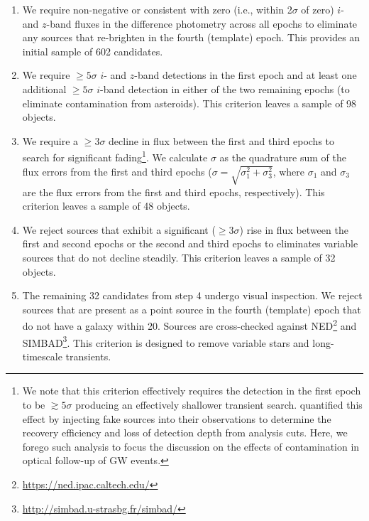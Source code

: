\begin{enumerate}

\item We require non-negative or consistent with zero 
(i.e., within 2$\sigma$ of zero) 
$i$- and $z$-band fluxes in the difference photometry
across all epochs to eliminate any sources that re-brighten in the 
fourth (template) epoch. This provides an initial sample of 602 candidates.

\item We require $\ge 5\sigma$ $i$- and $z$-band detections in the
first epoch and at least one additional $\ge 5\sigma$ $i$-band
detection in either of the two remaining epochs (to eliminate contamination
from asteroids). This criterion leaves a sample of 98 objects.

\clearpage
\item We require a $\ge 3\sigma$ decline in flux between the first and
third epochs to search for significant fading\footnote{\singlespace We note that this 
criterion effectively requires the detection in the first epoch to be $\gtrsim 5\sigma$ 
producing an effectively shallower transient search.  \citet{GW150914DECam} quantified this effect by injecting fake sources into 
their observations to determine the recovery efficiency and loss of detection
depth from analysis cuts. Here, we forego 
such analysis to focus the discussion on the effects of contamination in 
optical follow-up of GW events.}. We calculate $\sigma$ as the 
quadrature sum of the flux errors from the first and third epochs 
($\sigma = \sqrt{\sigma_1^2 + \sigma_3^2}$, where $\sigma_1$ and
$\sigma_3$ are the flux errors from the first and third epochs,
respectively). This criterion leaves a sample of 48 objects.

\item We reject sources that exhibit a significant ($\ge 3\sigma$) rise in flux 
between the first and second epochs or the second and third epochs to eliminates variable 
sources that do not decline steadily. This criterion leaves a sample of 32 objects. 

\item The remaining 32 candidates from step 4 undergo visual inspection. We reject sources
that are present as a point source in the fourth (template) epoch that do not have a galaxy
within 20\arcsec. Sources are cross-checked against NED\footnote{\singlespace \url{https://ned.ipac.caltech.edu/}} 
and SIMBAD\footnote{\singlespace \url{http://simbad.u-strasbg.fr/simbad/}}. This criterion is designed to remove
variable stars and long-timescale transients.
\end{enumerate}

